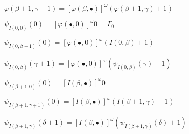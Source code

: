 \documentclass[10pt]{article}
\begin{document}
\( \varphi(\beta+1,\gamma+1) = [\varphi(\beta,\bullet)]^\omega (\varphi(\beta+1,\gamma)+1) \)


\( \psi_{I(0,0)}(0) = [\varphi(\bullet,0)]^\omega 0 = \Gamma_0 \)

\( \psi_{I(0,\beta+1)}(0) = [\varphi(\bullet,0)]^\omega(I(0,\beta)+1) \)

\( \psi_{I(0,\beta)}(\gamma+1) = [\varphi(\bullet,0)]^\omega(\psi_{I(0,\beta)}(\gamma)+1) \)


\( \psi_{I(\beta+1,0)}(0) = [I(\beta,\bullet)]^\omega 0 \)

\( \psi_{I(\beta+1,\gamma+1)}(0) = [I(\beta,\bullet)]^\omega (I(\beta+1,\gamma)+1) \)

\( \psi_{I(\beta+1,\gamma)}(\delta+1) = [I(\beta,\bullet)]^\omega (\psi_{I(\beta+1,\gamma)}(\delta)+1) \)
\end{document}
